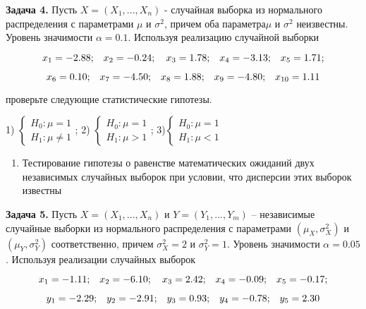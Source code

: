 \textbf{Задача 4. }Пусть $X=\left(X_{1} ,...,X_{n} \right)$ - случайная выборка из нормального распределения с параметрами $\mu $ и $\sigma ^{2} $, причем оба параметра$\mu $ и $\sigma ^{2} $ неизвестны. Уровень значимости $\alpha =0.1$. Используя реализацию случайной выборки 

\[x_{1} =-{\rm 2.88;}\quad x_{2} =-0.{\rm 24};\quad x_{3} ={\rm 1.78;}\quad x_{4} =-{\rm 3.13;}\quad x_{5} ={\rm 1.71;}\] 

\[x_{6} =0.{\rm 1}0{\rm ;}\quad x_{7} =-{\rm 4.5}0{\rm ;}\quad x_{8} ={\rm 1.88;}\quad x_{9} =-{\rm 4.8}0{\rm ;}\quad x_{10} ={\rm 1.11}\] 

проверьте следующие статистические гипотезы.

1) $\left\{\begin{array}{l} {H_{0} :\mu =1} \\ {H_{1} :\mu \ne 1} \end{array}\right. $;             2) $\left\{\begin{array}{l} {H_{0} :\mu =1} \\ {H_{1} :\mu >1} \end{array}\right. $;             3)$\left\{\begin{array}{l} {H_{0} :\mu =1} \\ {H_{1} :\mu <1} \end{array}\right. $



\begin{enumerate}
\item  Тестирование гипотезы о равенстве математических ожиданий двух независимых случайных выборок при условии, что дисперсии этих выборок известны 
\end{enumerate}



\textbf{Задача 5.} Пусть $X=\left(X_{1} ,...,X_{n} \right)$ и $Y=\left(Y_{1} ,...,Y_{m} \right)$ -- независимые случайные выборки из нормального распределения с параметрами $\left(\mu _{X} ,\sigma _{X}^{2} \right)$ и $\left(\mu _{Y} ,\sigma _{Y}^{2} \right)$ соответственно, причем $\sigma _{X}^{2} =2$ и $\sigma _{Y}^{2} =1$. Уровень значимости $\alpha =0.05$. Используя реализации случайных выборок 

\[x_{1} =-{\rm 1.11;}\quad x_{2} =-{\rm 6.1}0;\quad x_{3} ={\rm 2.42;}\quad x_{4} =-0.0{\rm 9;}\quad x_{5} =-0.{\rm 17;}\] 

\[y_{1} =-{\rm 2.29;}\quad y_{2} =-{\rm 2.91;}\quad y_{3} =0.{\rm 93;}\quad y_{4} =-0.{\rm 78;}\quad y_{5} ={\rm 2.3}0\] 

